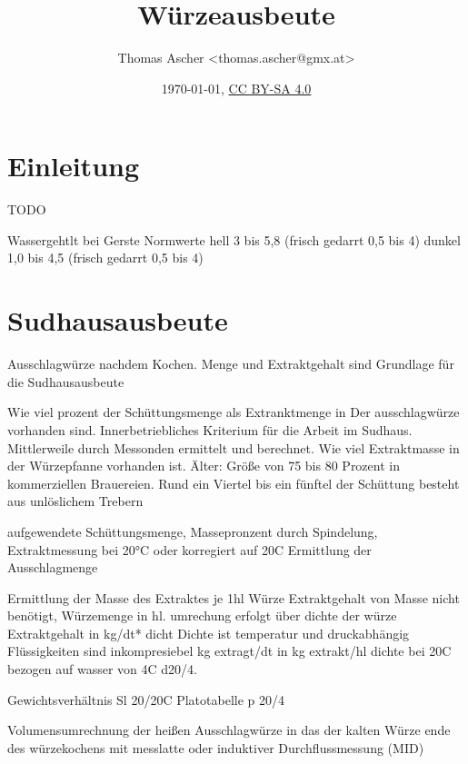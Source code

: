 \documentclass[a4paper,parskip=half]{scrartcl}
\title{Würzeausbeute}
\author{Thomas Ascher <thomas.ascher@gmx.at>}
\date{\today, \href{http://creativecommons.org/licenses/by-sa/4.0/}{CC BY-SA 4.0}}
\begin{document}
\maketitle

\section*{Einleitung}

\parencite{Kunze2016}

TODO


Wassergehtlt bei Gerste Normwerte 
hell 3 bis 5,8 (frisch gedarrt 0,5 bis 4)
dunkel 1,0 bis 4,5 (frisch gedarrt 0,5 bis 4)
\parencite[194]{Kunze2016}

\section*{Sudhausausbeute}

Ausschlagwürze nachdem Kochen. Menge und Extraktgehalt sind Grundlage für die Sudhausausbeute \parencite[350-358]{Kunze2016}

Wie viel prozent der Schüttungsmenge als Extranktmenge in Der ausschlagwürze vorhanden sind. Innerbetriebliches Kriterium für die Arbeit im Sudhaus.
Mittlerweile durch Messonden ermittelt und berechnet.
Wie viel Extraktmasse in der Würzepfanne vorhanden ist.
Älter:
Größe von 75 bis 80 Prozent in kommerziellen Brauereien.
Rund ein Viertel bis ein fünftel der Schüttung besteht aus unlöslichem Trebern

aufgewendete Schüttungsmenge,
Massepronzent durch Spindelung, Extraktmessung bei 20°C oder korregiert auf 20C
Ermittlung der Ausschlagmenge

\parencite[350\psqq]{Kunze2016}

Ermittlung der Masse des Extraktes je 1hl Würze Extraktgehalt von
Masse nicht benötigt, Würzemenge in hl. umrechung erfolgt über dichte der würze
Extraktgehalt in kg/dt* dicht
Dichte ist temperatur und druckabhängig
Flüssigkeiten sind inkompresiebel kg extragt/dt in kg extrakt/hl dichte bei 20C bezogen auf wasser von 4C d20/4.

Gewichtsverhältnis Sl 20/20C Platotabelle p 20/4

Volumensumrechnung der heißen Ausschlagwürze in das der kalten Würze
ende des würzekochens mit messlatte oder induktiver Durchflussmessung (MID)
\end{document}

